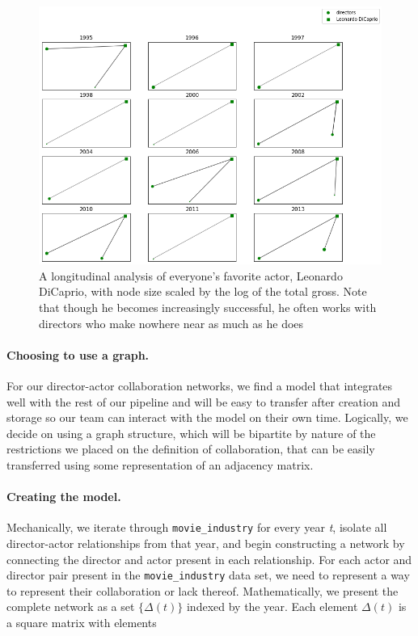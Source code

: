 \documentclass{article}
\begin{document}
\begin{figure}
    \centering
    \includegraphics[scale=0.5]{figures/DiCaprio_Longitudinal_Network_2.png}
    \caption{A longitudinal analysis of everyone's favorite actor, Leonardo DiCaprio, with node size scaled by the log of the total gross. Note that though he becomes increasingly successful, he often works with directors who make nowhere near as much as he does}
    \label{fig:t-graph-fig-2}
\end{figure}

\paragraph{Choosing to use a graph.}
For our director-actor collaboration networks, we find a model that integrates well with the rest of our pipeline and will be easy to transfer after creation and storage so our team can interact with the model on their own time. Logically, we decide on using a graph structure, which will be bipartite by nature of the restrictions we placed on the definition of collaboration, that can be easily transferred using some representation of an adjacency matrix. 

\paragraph{Creating the model.}
Mechanically, we iterate through \texttt{movie\_industry} for every year \emph{t}, isolate all director-actor relationships from that year, and begin constructing a network by connecting the director and actor present in each relationship. For each actor and director pair present in the \texttt{movie\_industry} data set, we need to represent a way to represent their collaboration or lack thereof. Mathematically, we present the complete network as a set $\{\Delta(t)\}$ indexed by the year. Each element $\Delta(t)$ is a square matrix with elements
\end{document}
